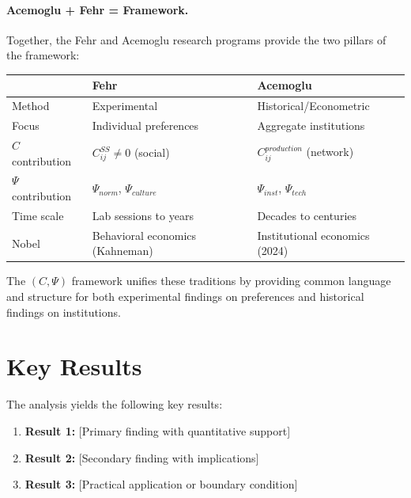\paragraph{Acemoglu + Fehr = Framework.}
Together, the Fehr and Acemoglu research programs provide the two pillars
of the framework:

\begin{center}
\renewcommand{\arraystretch}{1.2}
\begin{tabular}{lll}
\hline
& \textbf{Fehr} & \textbf{Acemoglu} \\
\hline
Method & Experimental & Historical/Econometric \\
Focus & Individual preferences & Aggregate institutions \\
$C$ contribution & $C^{SS}_{ij} \neq 0$ (social) & $C_{ij}^{production}$ (network) \\
$\Psi$ contribution & $\Psi_{norm}$, $\Psi_{culture}$ & $\Psi_{inst}$, $\Psi_{tech}$ \\
Time scale & Lab sessions to years & Decades to centuries \\
Nobel & Behavioral economics (Kahneman) & Institutional economics (2024) \\
\hline
\end{tabular}
\end{center}

The $(C, \Psi)$ framework unifies these traditions by providing common
language and structure for both experimental findings on preferences
and historical findings on institutions.




\section{Key Results}
\label{sec:ace-results}

The analysis yields the following key results:

\begin{enumerate}
    \item \textbf{Result 1:} [Primary finding with quantitative support]
    \item \textbf{Result 2:} [Secondary finding with implications]
    \item \textbf{Result 3:} [Practical application or boundary condition]
\end{enumerate}


